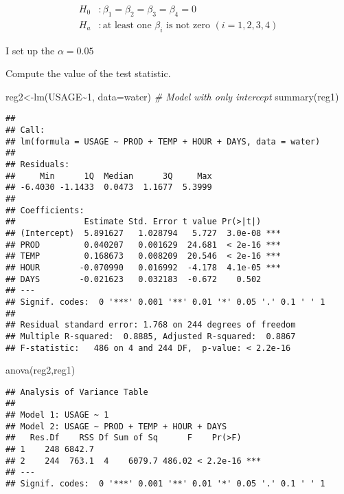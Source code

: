 \documentclass[
]{article}
\newenvironment{Shaded}{\begin{snugshade}}{\end{snugshade}}
\newcommand{\AttributeTok}[1]{\textcolor[rgb]{0.77,0.63,0.00}{#1}}
\newcommand{\CommentTok}[1]{\textcolor[rgb]{0.56,0.35,0.01}{\textit{#1}}}
\newcommand{\DecValTok}[1]{\textcolor[rgb]{0.00,0.00,0.81}{#1}}
\newcommand{\FunctionTok}[1]{\textcolor[rgb]{0.00,0.00,0.00}{#1}}
\newcommand{\NormalTok}[1]{#1}
\newcommand{\OtherTok}[1]{\textcolor[rgb]{0.56,0.35,0.01}{#1}}
\newcommand{\SpecialCharTok}[1]{\textcolor[rgb]{0.00,0.00,0.00}{#1}}
\begin{document}
\[
\begin{aligned}
H_0&:\beta_1=\beta_2=\beta_3=\beta_4=0\\
H_a&:\mbox{at least one }\beta_i\mbox{ is not zero } (i=1,2,3,4) 
\end{aligned}
\]

I set up the \(\alpha = 0.05\)

Compute the value of the test statistic.

\begin{Shaded}
\begin{Highlighting}[]
\NormalTok{reg2}\OtherTok{\textless{}{-}}\FunctionTok{lm}\NormalTok{(USAGE}\SpecialCharTok{\textasciitilde{}}\DecValTok{1}\NormalTok{, }\AttributeTok{data=}\NormalTok{water) }\CommentTok{\# Model with only intercept}
\FunctionTok{summary}\NormalTok{(reg1)}
\end{Highlighting}
\end{Shaded}

\begin{verbatim}
## 
## Call:
## lm(formula = USAGE ~ PROD + TEMP + HOUR + DAYS, data = water)
## 
## Residuals:
##     Min      1Q  Median      3Q     Max 
## -6.4030 -1.1433  0.0473  1.1677  5.3999 
## 
## Coefficients:
##              Estimate Std. Error t value Pr(>|t|)    
## (Intercept)  5.891627   1.028794   5.727  3.0e-08 ***
## PROD         0.040207   0.001629  24.681  < 2e-16 ***
## TEMP         0.168673   0.008209  20.546  < 2e-16 ***
## HOUR        -0.070990   0.016992  -4.178  4.1e-05 ***
## DAYS        -0.021623   0.032183  -0.672    0.502    
## ---
## Signif. codes:  0 '***' 0.001 '**' 0.01 '*' 0.05 '.' 0.1 ' ' 1
## 
## Residual standard error: 1.768 on 244 degrees of freedom
## Multiple R-squared:  0.8885, Adjusted R-squared:  0.8867 
## F-statistic:   486 on 4 and 244 DF,  p-value: < 2.2e-16
\end{verbatim}

\begin{Shaded}
\begin{Highlighting}[]
\FunctionTok{anova}\NormalTok{(reg2,reg1)}
\end{Highlighting}
\end{Shaded}

\begin{verbatim}
## Analysis of Variance Table
## 
## Model 1: USAGE ~ 1
## Model 2: USAGE ~ PROD + TEMP + HOUR + DAYS
##   Res.Df    RSS Df Sum of Sq      F    Pr(>F)    
## 1    248 6842.7                                  
## 2    244  763.1  4    6079.7 486.02 < 2.2e-16 ***
## ---
## Signif. codes:  0 '***' 0.001 '**' 0.01 '*' 0.05 '.' 0.1 ' ' 1
\end{verbatim}
\end{document}
